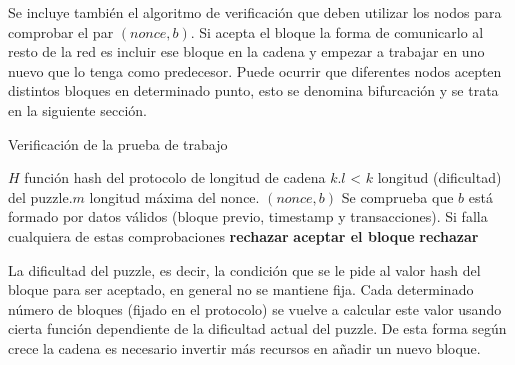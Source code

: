 Se incluye también el algoritmo de verificación que deben utilizar los nodos para comprobar el par $(nonce, b)$. Si acepta el bloque la forma de comunicarlo al resto de la red es incluir ese bloque en la cadena y empezar a trabajar en uno nuevo que lo tenga como predecesor. Puede ocurrir que diferentes nodos acepten distintos bloques en determinado punto, esto se denomina bifurcación y se trata en la siguiente sección.
\begin{algorithm}
\caption{Verificación de la prueba de trabajo}\label{alg:pow_check}
\begin{algorithmic}[1]
\Require \Statex $H$ función hash del protocolo de longitud de cadena $k$.\Statex $l$ < $k$ longitud (dificultad) del puzzle.\Statex $m$ longitud máxima del nonce. \Statex $(nonce, b)$
\State Se comprueba que $b$ está formado por datos válidos (bloque previo, timestamp y transacciones). Si falla cualquiera de estas comprobaciones \textbf{rechazar}
 \Return \textbf{aceptar el bloque}
\Else  \textbf{ rechazar}
\EndIf
\end{algorithmic}
\end{algorithm}

\begin{figure}[H]
  \qquad
	\label{fig:flux}%
\end{figure}

La dificultad del puzzle, es decir, la condición que se le pide al valor hash del bloque para ser aceptado, en general no se mantiene fija. Cada determinado número de bloques (fijado en el protocolo) se vuelve a calcular este valor usando cierta función dependiente de la dificultad actual del puzzle. De esta forma según crece la cadena es necesario invertir más recursos en añadir un nuevo bloque.

